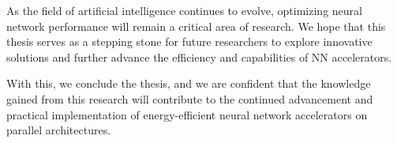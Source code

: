 As the field of artificial intelligence continues to evolve, optimizing neural network performance will remain a critical area of research. We hope that this thesis serves as a stepping stone for future researchers to explore innovative solutions and further advance the efficiency and capabilities of NN accelerators.

With this, we conclude the thesis, and we are confident that the knowledge gained from this research will contribute to the continued advancement and practical implementation of energy-efficient neural network accelerators on parallel architectures.